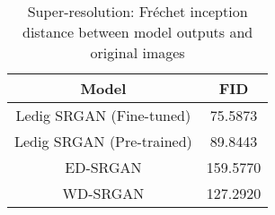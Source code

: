 \begin{table}[!htb]
\centering
\setlength{\tabcolsep}{4pt} %
\renewcommand{\arraystretch}{1.5} %
\begin{tabular}{c | c }
        \hline
        \textbf{Model} & \textbf{FID}\\
        \hline
        Ledig SRGAN (Fine-tuned) & 75.5873\\
        Ledig SRGAN (Pre-trained) & 89.8443\\
        ED-SRGAN & 159.5770\\
        WD-SRGAN & 127.2920\\
        \hline
    \end{tabular}
\caption{Super-resolution: Fréchet inception distance between model outputs and original images}
\label{tab:super-resolution_FID}
\end{table}